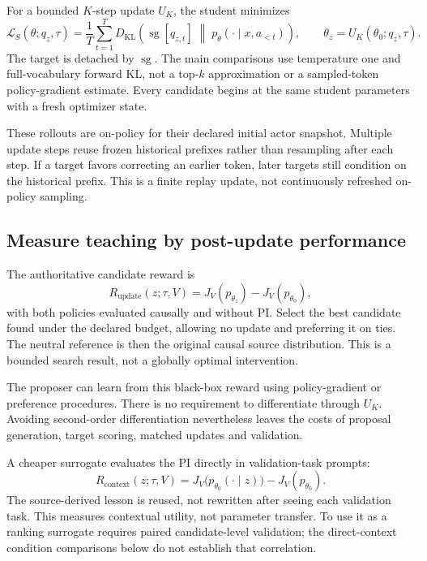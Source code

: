\documentclass[11pt,letterpaper]{article}
\newcommand{\KL}{D_{\mathrm{KL}}}
\newcommand{\sg}{\operatorname{sg}}
\newcommand{\score}{J}
\begin{document}
For a bounded $K$-step update $U_K$, the student minimizes
\begin{equation}
\mathcal L_S(\theta;q_z,\tau)
=\frac1T\sum_{t=1}^{T}
\KL\!\left(\sg[q_{z,t}]\;\middle\|\;
p_\theta(\cdot\mid x,a_{<t})\right),
\qquad
\theta_z=U_K(\theta_0;q_z,\tau).
\label{eq:student}
\end{equation}
The target is detached by $\sg$. The main comparisons use temperature one and full-vocabulary forward KL, not a top-$k$ approximation or a sampled-token policy-gradient estimate. Every candidate begins at the same student parameters with a fresh optimizer state.

These rollouts are on-policy for their declared initial actor snapshot. Multiple update steps reuse frozen historical prefixes rather than resampling after each step. If a target favors correcting an earlier token, later targets still condition on the historical prefix. This is a finite replay update, not continuously refreshed on-policy sampling.

\subsection{Measure teaching by post-update performance}

The authoritative candidate reward is
\begin{equation}
R_{\mathrm{update}}(z;\tau,V)
=\score_V(p_{\theta_z})-\score_V(p_{\theta_0}),
\label{eq:reward}
\end{equation}
with both policies evaluated causally and without PI. Select the best candidate found under the declared budget, allowing no update and preferring it on ties. The neutral reference is then the original causal source distribution. This is a bounded search result, not a globally optimal intervention.

The proposer can learn from this black-box reward using policy-gradient or preference procedures. There is no requirement to differentiate through $U_K$. Avoiding second-order differentiation nevertheless leaves the costs of proposal generation, target scoring, matched updates and validation.

A cheaper surrogate evaluates the PI directly in validation-task prompts:
\begin{equation}
R_{\mathrm{context}}(z;\tau,V)
=\score_V\bigl(p_{\theta_0}(\cdot\mid z)\bigr)-\score_V(p_{\theta_0}).
\label{eq:context}
\end{equation}
The source-derived lesson is reused, not rewritten after seeing each validation task. This measures contextual utility, not parameter transfer. To use it as a ranking surrogate requires paired candidate-level validation; the direct-context condition comparisons below do not establish that correlation.
\end{document}
